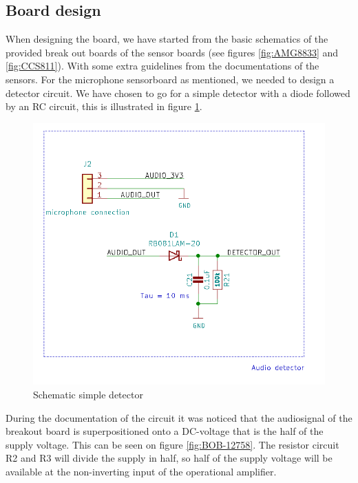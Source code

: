\documentclass[11pt,a4paper]{article}
\begin{document}
\subsection{Board design}
When designing the board, we have started from the basic schematics of the provided break out boards of the sensor boards (see figures \ref{fig:AMG8833} and \ref{fig:CCS811}). With some extra guidelines from the documentations of the sensors. For the microphone sensorboard as mentioned, we needed to design a detector circuit. We have chosen to go for a simple detector with a diode followed by an RC circuit, this is illustrated in figure \ref{fig:simple_detector}.
\begin{figure}[H]
	\centering
	\includegraphics[width=0.8\linewidth]{Schematic_audio_detector.png}
	\caption{Schematic simple detector}
	\label{fig:simple_detector}
\end{figure}
During the documentation of the circuit it was noticed that the audiosignal of the breakout board is superpositioned onto a DC-voltage that is the half of the supply voltage. This can be seen on figure \ref{fig:BOB-12758}. The resistor circuit R2 and R3 will divide the supply in half, so half of the supply voltage will be available at the non-inverting input of the operational amplifier.
\end{document}
